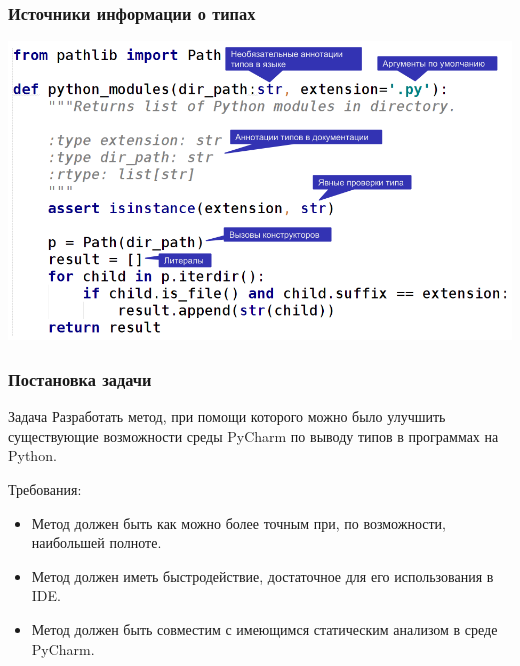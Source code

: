 \documentclass[handout]{beamer}
\begin{document}
\begin{frame}[fragile]
  \frametitle{Источники информации о типах}



  \includegraphics[width=0.9\paperwidth]{fig/type-sources-annotated.png}
    
\end{frame}

\begin{frame}
    \frametitle{Постановка задачи}
    \begin{block}{Задача}
        Разработать метод, при помощи которого можно было улучшить существующие
        возможности среды PyCharm по выводу типов в программах на Python.
    \end{block}

    Требования:
    \begin{itemize}
        \item Метод должен быть как можно более точным при, по возможности,
          наибольшей полноте.

        \item Метод должен иметь быстродействие, достаточное для его использования в
          IDE.

        \item Метод должен быть совместим с имеющимся статическим анализом в
          среде PyCharm.
    \end{itemize}

\end{frame}
\end{document}

